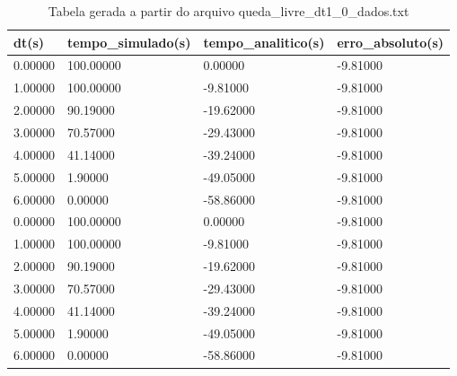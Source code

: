\begin{table}
\caption{Tabela gerada a partir do arquivo queda_livre_dt1_0_dados.txt}
\label{tab:queda_livre_dt1_0_dados}
\begin{tabular}{llll}
\toprule
dt(s) & tempo_simulado(s) & tempo_analitico(s) & erro_absoluto(s) \\
\midrule
0.00000 & 100.00000 & 0.00000 & -9.81000 \\
1.00000 & 100.00000 & -9.81000 & -9.81000 \\
2.00000 & 90.19000 & -19.62000 & -9.81000 \\
3.00000 & 70.57000 & -29.43000 & -9.81000 \\
4.00000 & 41.14000 & -39.24000 & -9.81000 \\
5.00000 & 1.90000 & -49.05000 & -9.81000 \\
6.00000 & 0.00000 & -58.86000 & -9.81000 \\
0.00000 & 100.00000 & 0.00000 & -9.81000 \\
1.00000 & 100.00000 & -9.81000 & -9.81000 \\
2.00000 & 90.19000 & -19.62000 & -9.81000 \\
3.00000 & 70.57000 & -29.43000 & -9.81000 \\
4.00000 & 41.14000 & -39.24000 & -9.81000 \\
5.00000 & 1.90000 & -49.05000 & -9.81000 \\
6.00000 & 0.00000 & -58.86000 & -9.81000 \\
\bottomrule
\end{tabular}
\end{table}
